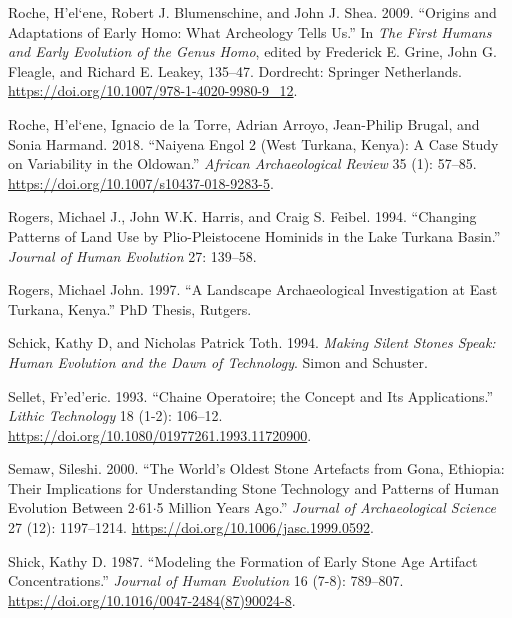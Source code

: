 \documentclass[]{elsarticle} %
\begin{document}
\leavevmode\hypertarget{ref-rocheOriginsAdaptationsEarly2009}{}%
Roche, H\a'el\a`ene, Robert J. Blumenschine, and John J. Shea. 2009.
``Origins and Adaptations of Early Homo: What Archeology Tells Us.'' In
\emph{The First Humans and Early Evolution of the Genus Homo}, edited by
Frederick E. Grine, John G. Fleagle, and Richard E. Leakey, 135--47.
Dordrecht: Springer Netherlands.
\url{https://doi.org/10.1007/978-1-4020-9980-9_12}.

\leavevmode\hypertarget{ref-rocheNaiyenaEngolWest2018}{}%
Roche, H\a'el\a`ene, Ignacio de la Torre, Adrian Arroyo, Jean-Philip
Brugal, and Sonia Harmand. 2018. ``Naiyena Engol 2 (West Turkana,
Kenya): A Case Study on Variability in the Oldowan.'' \emph{African
Archaeological Review} 35 (1): 57--85.
\url{https://doi.org/10.1007/s10437-018-9283-5}.

\leavevmode\hypertarget{ref-rogersChangingPatternsLand1994}{}%
Rogers, Michael J., John W.K. Harris, and Craig S. Feibel. 1994.
``Changing Patterns of Land Use by Plio-Pleistocene Hominids in the Lake
Turkana Basin.'' \emph{Journal of Human Evolution} 27: 139--58.

\leavevmode\hypertarget{ref-rogersLandscapeArchaeologicalInvestigation1997}{}%
Rogers, Michael John. 1997. ``A Landscape Archaeological Investigation
at East Turkana, Kenya.'' PhD Thesis, Rutgers.

\leavevmode\hypertarget{ref-schick1994making}{}%
Schick, Kathy D, and Nicholas Patrick Toth. 1994. \emph{Making Silent
Stones Speak: Human Evolution and the Dawn of Technology}. Simon and
Schuster.

\leavevmode\hypertarget{ref-selletChaineOperatoireConcept1993}{}%
Sellet, Fr\a'ed\a'eric. 1993. ``Chaine Operatoire; the Concept and Its
Applications.'' \emph{Lithic Technology} 18 (1-2): 106--12.
\url{https://doi.org/10.1080/01977261.1993.11720900}.

\leavevmode\hypertarget{ref-semawWorldOldestStone2000}{}%
Semaw, Sileshi. 2000. ``The World's Oldest Stone Artefacts from Gona,
Ethiopia: Their Implications for Understanding Stone Technology and
Patterns of Human Evolution Between 2\(\cdot\)61\(\cdot\)5 Million Years
Ago.'' \emph{Journal of Archaeological Science} 27 (12): 1197--1214.
\url{https://doi.org/10.1006/jasc.1999.0592}.

\leavevmode\hypertarget{ref-shickModelingFormationEarly1987}{}%
Shick, Kathy D. 1987. ``Modeling the Formation of Early Stone Age
Artifact Concentrations.'' \emph{Journal of Human Evolution} 16 (7-8):
789--807. \url{https://doi.org/10.1016/0047-2484(87)90024-8}.
\end{document}
